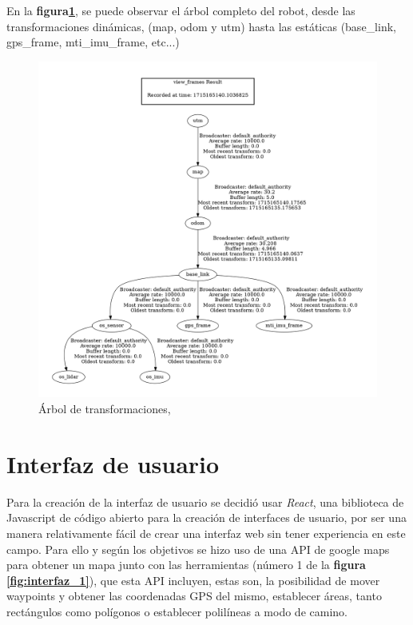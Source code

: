 En la  \textbf{figura\ref{fig:arbol_urdf}}, se puede observar el árbol completo del robot, desde las transformaciones dinámicas, 
(map, odom y utm) hasta las estáticas (base\_link, gps\_frame, mti\_imu\_frame, etc...)

\begin{figure}[h]
    \centering
    \includegraphics[width=1\textwidth]{images/arbol_transformaciones_hunter.jpg}
    \caption{Árbol de transformaciones,}
    \label{fig:arbol_urdf}
\end{figure}

\newpage
\section{Interfaz de usuario}

Para la creación de la interfaz de usuario se decidió usar \textit{React}, una biblioteca de Javascript de código abierto para la creación de 
interfaces de usuario, por ser una manera relativamente fácil de crear una interfaz web sin tener experiencia en este campo. Para ello 
y según los objetivos se hizo uso de una API de google maps para obtener un mapa junto con las herramientas  
(número 1 de la \textbf{figura \ref{fig:interfaz_1}}), que esta API incluyen, estas son, la posibilidad de mover waypoints y obtener 
las coordenadas GPS del mismo, establecer áreas, tanto rectángulos como polígonos o establecer polilíneas a modo de camino.

